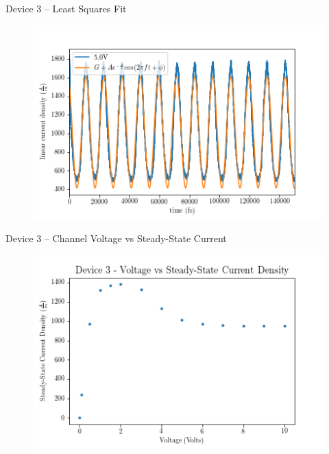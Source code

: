 \documentclass{beamer}
\begin{document}
\begin{frame}{Device 3 -- Least Squares Fit}
    \begin{figure}
        \centering
        \includegraphics[scale=0.5]{Figures/Device_3/Curve_fit/5_0V.png}
        \label{fig:dev_3_fit}
    \end{figure}
\end{frame}

\begin{frame}{Device 3 -- Channel Voltage vs Steady-State Current}
    \begin{figure}
        \centering
        \includegraphics[scale=0.5]{Figures/Device_3/SteadyState.png}
        \label{fig:dev_3_steady}
    \end{figure}
\end{frame}
 
\end{document}
